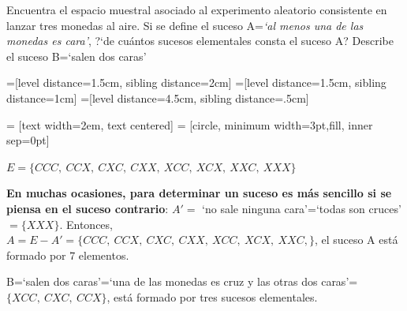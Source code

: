 \begin{ejemplo}
\begin{ejre}
Encuentra el espacio muestral asociado al experimento aleatorio consistente en lanzar tres monedas al aire. Si se define el suceso A=\emph{`al menos una de las monedas es cara'}, ?`de cuántos sucesos elementales consta el suceso A?	Describe el suceso B=`salen dos caras' 
\end{ejre}
\vspace{4mm} 
=[level distance=1.5cm, sibling distance=2cm]
=[level distance=1.5cm, sibling distance=1cm]
=[level distance=4.5cm, sibling distance=.5cm]

 = [text width=2em, text centered]
 = [circle, minimum width=3pt,fill, inner sep=0pt]


$E=\{CCC,\ CCX,\ CXC,\ CXX,\ XCC,\ XCX,\ XXC,\ XXX  \}$

\textbf{En muchas ocasiones, para determinar un suceso es más sencillo si se piensa en el suceso contrario}: $A'=$ `no sale ninguna cara'=`todas son cruces' $=\{XXX \}$. Entonces, $A=E-A'=\{CCC,\ CCX,\ CXC,\ CXX,\ XCC,\ XCX,\ XXC,  \}$, el suceso A está formado por 7 elementos.

B=`salen dos caras'=`una de las monedas es cruz y las otras dos caras'=$\{XCC,\ CXC,\ CCX\}$, está formado por tres sucesos elementales.
\end{ejemplo}

